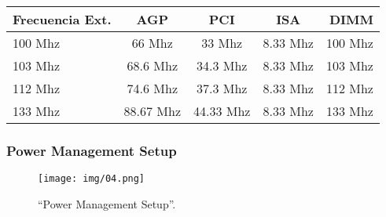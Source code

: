 \begin{description}
					\begin{tabular}{ l | c | c | c | r }
						\hline
	Frecuencia Ext. &      AGP         &    PCI    &    ISA    & DIMM \\ 
						\hline
	100 Mhz         &      66 Mhz      &  33 Mhz   &  8.33 Mhz & 100 Mhz \\ 
	103 Mhz         &     68.6 Mhz     & 34.3 Mhz  &  8.33 Mhz & 103 Mhz \\
	112 Mhz         &     74.6 Mhz     & 37.3 Mhz  &  8.33 Mhz & 112 Mhz \\ 
	133 Mhz         &    88.67 Mhz     & 44.33 Mhz &  8.33 Mhz & 133 Mhz \\ 
						\hline
					\end{tabular}
					
			\end{description}
			\newpage
			
		\subsubsection{Power Management Setup}{\label{sub:power management setup}}
			\begin{figure}[H]
				\centering
					\texttt{[image: img/04.png]}
				\caption{``Power Management Setup''.}
			\end{figure}
				
